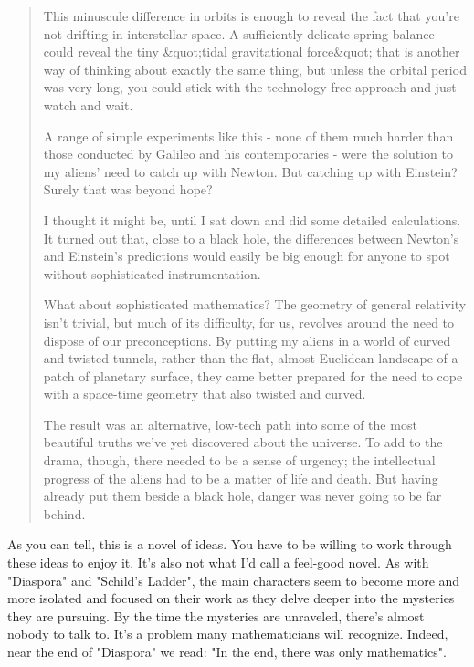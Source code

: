 \begin{quote}
  This minuscule difference in orbits is enough to reveal the fact that
  you're not drifting in interstellar space.  A sufficiently delicate 
  spring balance could reveal the tiny &quot;tidal gravitational force&quot; 
  that is another way of thinking about exactly the same thing, but 
  unless the orbital period was very long, you could stick with the 
  technology-free approach and just watch and wait.

  A range of simple experiments like this - none of them much harder 
  than those conducted by Galileo and his contemporaries - were the 
  solution to my aliens' need to catch up with Newton.  But catching 
  up with Einstein?  Surely that was beyond hope?

  I thought it might be, until I sat down and did some detailed 
  calculations.  It turned out that, close to a black hole, the 
  differences between Newton's and Einstein's predictions would easily 
  be big enough for anyone to spot without sophisticated instrumentation.

  What about sophisticated mathematics?  The geometry of general 
  relativity isn't trivial, but much of its difficulty, for us, 
  revolves around the need to dispose of our preconceptions.  By 
  putting my aliens in a world of curved and twisted tunnels, rather 
  than the flat, almost Euclidean landscape of a patch of planetary 
  surface, they came better prepared for the need to cope with a 
  space-time geometry that also twisted and curved.

  The result was an alternative, low-tech path into some of the most 
  beautiful truths we've yet discovered about the universe.  To add 
  to the drama, though, there needed to be a sense of urgency; the 
  intellectual progress of the aliens had to be a matter of life and 
  death.  But having already put them beside a black hole, danger was 
  never going to be far behind.
\end{quote}
    

As you can tell, this is a novel of ideas.  You have to be willing to
work through these ideas to enjoy it.  It's also not what I'd call
a feel-good novel.  As with "Diaspora" and 
"Schild's Ladder", the main characters seem to become more and 
more isolated and focused on their work as they delve deeper into the 
mysteries they are pursuing.  By the time the mysteries are unraveled,
there's almost nobody to talk to.  It's a problem many mathematicians 
will recognize.  Indeed, near the end of "Diaspora" we read: 
"In the end, there was only mathematics".  
 
